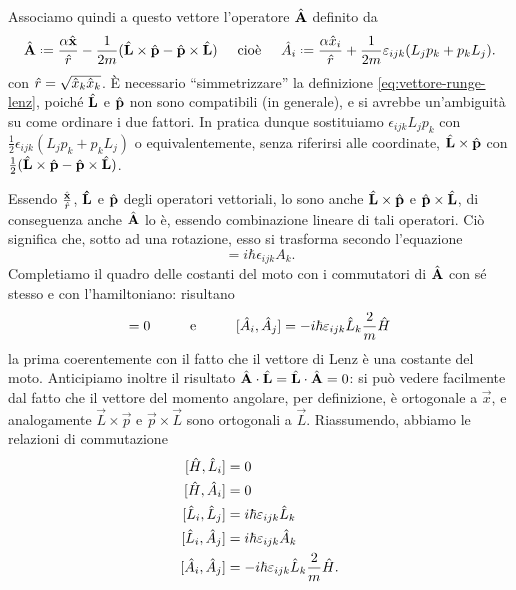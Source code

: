 Associamo quindi a questo vettore l'operatore $\hat{\mathbf{A}}$ definito da
\begin{equation}
	\op{\vec A}\defeq\frac{\alpha\op{\vec x}}{\op r}-\frac1{2m}(\op{\vec L}\times\op{\vec p}-\op{\vec p}\times\op{\vec L})
	\hspace{.5cm}\text{cioè}\hspace{.5cm}
	\op A_i\defeq \frac{\alpha \op x_i}{\op r}+\frac1{2m}\epsilon_{ijk}(L_jp_k+p_kL_j).
	\label{eq:operatore-vettore-lenz}
\end{equation}
con $\hat{r}=\sqrt{\hat{x}_k\hat{x}_k}$.
È necessario ``simmetrizzare'' la definizione \eqref{eq:vettore-runge-lenz}, poich\'e $\hat{\mathbf{L}}$ e $\hat{\mathbf{p}}$ non sono compatibili (in generale), e si avrebbe un'ambiguità su come ordinare i due fattori.
In pratica dunque sostituiamo $\epsilon_{ijk}L_jp_k$ con $\frac12\epsilon_{ijk}(L_jp_k+p_kL_j)$ o equivalentemente, senza riferirsi alle coordinate, $\hat{\mathbf{L}}\times\hat{\mathbf{p}}$ con $\frac12(\hat{\mathbf{L}}\times\hat{\mathbf{p}}-\hat{\mathbf{p}}\times\hat{\mathbf{L}})$.

Essendo $\frac{\hat{\mathbf{x}}}{\hat{r}}$, $\mathbf{\hat{L}}$ e $\hat{\mathbf{p}}$ degli operatori vettoriali, lo sono anche $\hat{\mathbf{L}}\times\hat{\mathbf{p}}$ e $\hat{\mathbf{p}}\times\hat{\mathbf{L}}$, di conseguenza anche $\hat{\mathbf{A}}$ lo è, essendo combinazione lineare di tali operatori.
Ciò significa che, sotto ad una rotazione, esso si trasforma secondo l'equazione
\begin{equation}
	[\op L_i,\op A_j]=i\hbar\epsilon_{ijk}A_k.
	\label{eq:commutazione-A-L}
\end{equation}
Completiamo il quadro delle costanti del moto con i commutatori di $\hat{\mathbf{A}}$ con s\'e stesso e con l'hamiltoniano: risultano
\begin{equation}
	[\op H,\op A_i]=0\hspace{1cm}\text{e}\hspace{1cm}[\op A_i,\op A_j]=-i\hbar\epsilon_{ijk}\op L_k\frac2{m}\op H
\end{equation}
la prima coerentemente con il fatto che il vettore di Lenz è una costante del moto.
Anticipiamo inoltre il risultato ${\hat{\mathbf{A}}}\cdot{\hat{\mathbf{L}}}={\hat{\mathbf{L}}}\cdot{\hat{\mathbf{A}}}=0$: si può vedere facilmente dal fatto che il vettore del momento angolare, per definizione, è ortogonale a $\vec x$, e analogamente $\vec L\times\vec p$ e $\vec p\times\vec L$ sono ortogonali a $\vec L$.
Riassumendo, abbiamo le relazioni di commutazione
\begin{equation}
	\begin{aligned}
		[\op H,\op L_i]&=0\\
		[\op H,\op A_i]&=0\\
		[\op L_i,\op L_j]&=i\hbar\epsilon_{ijk}\op L_k\\
		[\op L_i,\op A_j]&=i\hbar\epsilon_{ijk}\op A_k\\
		[\op A_i,\op A_j]&=-i\hbar\epsilon_{ijk}\op L_k\frac2{m}\op H.
	\end{aligned}
	\label{eq:commutazione-hamiltoniano-momento-angolare-lenz}
\end{equation}

